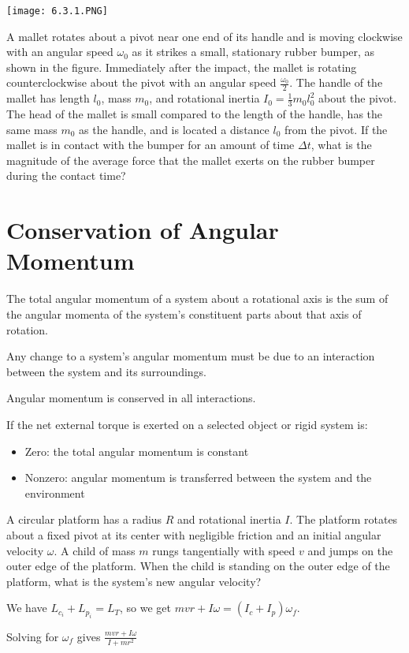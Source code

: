 \documentclass[../mech.tex]{subfiles}
\begin{document}
\ex \begin{center}
    \texttt{[image: 6.3.1.PNG]}
\end{center}
A mallet rotates about a pivot near one end of its handle and is moving clockwise with an angular speed $\omega_0$ as it strikes a small, stationary rubber bumper, as shown in the figure. Immediately after the impact, the mallet is rotating counterclockwise about the pivot with an angular speed 
$\frac{\omega_0}{2}$. The handle of the mallet has length $l_0$, mass $m_0$, and rotational inertia $I_0 = \frac{1}{3}m_0l_0^2$ about the pivot. The head of the mallet is small compared to the length of the handle, has the same mass $m_0$ as the handle, and is located a distance 
$l_0$ from the pivot. If the mallet is in contact with the bumper for an amount of time $\Delta t$, what is the magnitude of the average force that the mallet exerts on the rubber bumper during the contact time?

\section{Conservation of Angular Momentum}
The total angular momentum of a system about a rotational axis is the sum of the angular momenta of the system's constituent parts about that axis of rotation.

Any change to a system's angular momentum must be due to an interaction between the system and its surroundings.

Angular momentum is conserved in all interactions.

If the net external torque is exerted on a selected object or rigid system is:
\begin{itemize}
    \item Zero: the total angular momentum is constant 
    \item Nonzero: angular momentum is transferred between the system and the environment 
\end{itemize}

\begin{example}
    A circular platform has a radius $R$ and rotational inertia $I$. The platform rotates about a fixed pivot at its center with negligible friction and an initial angular velocity $\omega$.
    A child of mass $m$ rungs tangentially with speed $v$ and jumps on the outer edge of the platform. When the child is standing on the outer edge of the platform, what is the system's new angular velocity?

    We have $L_{c_i}+L_{p_i}=L_T$, so we get $mvr+I\omega = (I_c+I_p)\omega_f$.

    Solving for $\omega_f$ gives $\frac{mvr+I\omega}{I+mr^2}$
\end{example}
\end{document}
